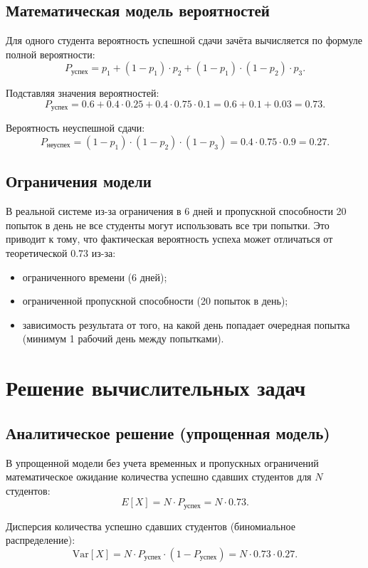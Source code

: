 \documentclass[a4paper, 14pt]{extarticle}
\begin{document}
\subsection{Математическая модель вероятностей}
Для одного студента вероятность успешной сдачи зачёта вычисляется по формуле полной вероятности:
\[
P_{\text{успех}} = p_1 + (1-p_1) \cdot p_2 + (1-p_1) \cdot (1-p_2) \cdot p_3.
\]

Подставляя значения вероятностей:
\[
P_{\text{успех}} = 0.6 + 0.4 \cdot 0.25 + 0.4 \cdot 0.75 \cdot 0.1 = 0.6 + 0.1 + 0.03 = 0.73.
\]

Вероятность неуспешной сдачи:
\[
P_{\text{неуспех}} = (1-p_1) \cdot (1-p_2) \cdot (1-p_3) = 0.4 \cdot 0.75 \cdot 0.9 = 0.27.
\]

\subsection{Ограничения модели}
В реальной системе из-за ограничения в 6 дней и пропускной способности 20 попыток в день не все студенты могут использовать все три попытки. Это приводит к тому, что фактическая вероятность успеха может отличаться от теоретической $0.73$ из-за:
\begin{itemize}
  \item ограниченного времени (6 дней);
  \item ограниченной пропускной способности (20 попыток в день);
  \item зависимость результата от того, на какой день попадает очередная попытка (минимум 1 рабочий день между попытками).
\end{itemize}

\section{Решение вычислительных задач}
\label{sec:computational}

\subsection{Аналитическое решение (упрощенная модель)}
В упрощенной модели без учета временных и пропускных ограничений математическое ожидание количества успешно сдавших студентов для $N$ студентов:
\[
E[X] = N \cdot P_{\text{успех}} = N \cdot 0.73.
\]

Дисперсия количества успешно сдавших студентов (биномиальное распределение):
\[
\text{Var}[X] = N \cdot P_{\text{успех}} \cdot (1 - P_{\text{успех}}) = N \cdot 0.73 \cdot 0.27.
\]
\end{document}
